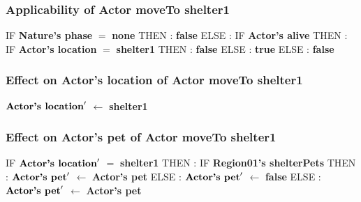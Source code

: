 \documentclass{article}%
\begin{document}
\subsubsection{Applicability of Actor moveTo shelter1}%
\label{ssubsec:Applicability of Actor moveTo shelter1}%
\begin{flushleft}%
IF %
\textbf{Nature's phase}%
$=$%
\textbf{none}%
\linebreak%
\hspace*{2em}%
THEN %
: %
\textbf{false}%
\linebreak%
\hspace*{2em}%
ELSE %
: %
IF %
\textbf{Actor's alive}%
\linebreak%
\hspace*{4em}%
THEN %
: %
IF %
\textbf{Actor's location}%
$=$%
\textbf{shelter1}%
\linebreak%
\hspace*{6em}%
THEN %
: %
\textbf{false}%
\linebreak%
\hspace*{6em}%
ELSE %
: %
\textbf{true}%
\linebreak%
\hspace*{4em}%
ELSE %
: %
\textbf{false}%
\end{flushleft}

%
\subsubsection{Effect on Actor's location of Actor moveTo shelter1}%
\label{ssubsec:Effect on Actor's location of Actor moveTo shelter1}%
\begin{flushleft}%
$\mbox{\textbf{Actor's location}} '$%
$\leftarrow$%
\textbf{shelter1}%
\end{flushleft}

%
\subsubsection{Effect on Actor's pet of Actor moveTo shelter1}%
\label{ssubsec:Effect on Actor's pet of Actor moveTo shelter1}%
\begin{flushleft}%
IF %
$\mbox{\textbf{Actor's location}} '$%
$=$%
\textbf{shelter1}%
\linebreak%
\hspace*{2em}%
THEN %
: %
IF %
\textbf{Region01's shelterPets}%
\linebreak%
\hspace*{4em}%
THEN %
: %
$\mbox{\textbf{Actor's pet}} '$%
$\leftarrow$%
\textbf{Actor's pet}%
\linebreak%
\hspace*{4em}%
ELSE %
: %
$\mbox{\textbf{Actor's pet}} '$%
$\leftarrow$%
\textbf{false}%
\linebreak%
\hspace*{2em}%
ELSE %
: %
$\mbox{\textbf{Actor's pet}} '$%
$\leftarrow$%
\textbf{Actor's pet}%
\end{flushleft}
\end{document}
